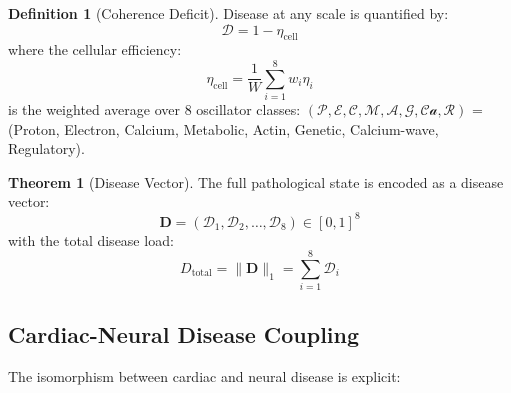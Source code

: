\documentclass[10pt,twocolumn,a4paper]{article}
\theoremstyle{definition}
\newtheorem{theorem}{Theorem}
\newtheorem{definition}{Definition}
\begin{document}
\begin{definition}[Coherence Deficit]
\label{def:coherence_deficit}
Disease at any scale is quantified by:
\begin{equation}
\boxed{\mathcal{D} = 1 - \eta_{\text{cell}}}
\end{equation}
where the cellular efficiency:
\begin{equation}
\eta_{\text{cell}} = \frac{1}{W}\sum_{i=1}^8 w_i \eta_i
\end{equation}
is the weighted average over 8 oscillator classes:
$(\mathcal{P}, \mathcal{E}, \mathcal{C}, \mathcal{M}, \mathcal{A}, \mathcal{G}, \mathcal{Ca}, \mathcal{R})$
= (Proton, Electron, Calcium, Metabolic, Actin, Genetic, Calcium-wave, Regulatory).
\end{definition}

\begin{theorem}[Disease Vector]
The full pathological state is encoded as a disease vector:
\begin{equation}
\mathbf{D} = (\mathcal{D}_1, \mathcal{D}_2, \ldots, \mathcal{D}_8) \in [0,1]^8
\end{equation}
with the total disease load:
\begin{equation}
D_{\text{total}} = \|\mathbf{D}\|_1 = \sum_{i=1}^8 \mathcal{D}_i
\end{equation}
\end{theorem}

\subsection{Cardiac-Neural Disease Coupling}

The isomorphism between cardiac and neural disease is explicit:
\end{document}
